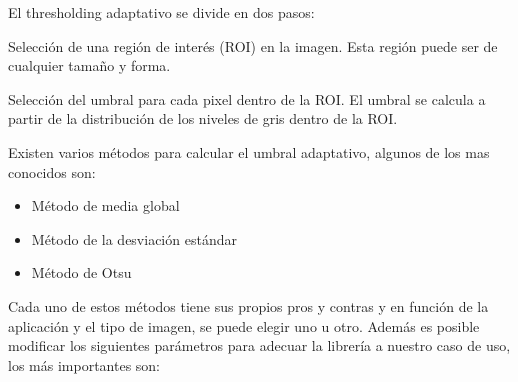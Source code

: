 El thresholding adaptativo se divide en dos pasos:

Selección de una región de interés (ROI) en la imagen. Esta región puede ser de cualquier tamaño y forma.

Selección del umbral para cada pixel dentro de la ROI. El umbral se calcula a partir de la distribución de los niveles de gris dentro de la ROI.

Existen varios métodos para calcular el umbral adaptativo, algunos de los mas conocidos son:
\begin{itemize}
\item Método de media global
\item Método de la desviación estándar
\item Método de Otsu
\end{itemize}
Cada uno de estos métodos tiene sus propios pros y contras y en función de la aplicación y el tipo de imagen, se puede elegir uno u otro.
Además es posible modificar los siguientes parámetros para adecuar la librería a nuestro caso de uso, los más importantes son:
